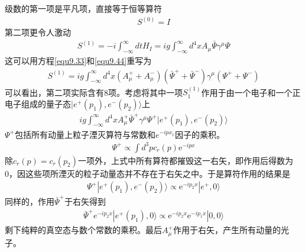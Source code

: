 级数的第一项是平凡项，直接等于恒等算符
\begin{align}\label{equ9.71}
S^{(0)}=I
\end{align}
第二项更令人激动
\begin{align}\label{equ9.72}
S^{(1)}=-i\int_{-\infty}^\infty dt H_I = ig\int_{-\infty}^\infty d^4x A_\mu \bar{\Psi}\gamma^\mu\Psi
\end{align}
这可以用方程\eqref{equ9.33}和\eqref{equ9.44}重写为
\begin{align}\label{equ9.73}
S^{(1)}=ig\int_{-\infty}^\infty d^4x (A_\mu^++A_\mu^-) (\bar{\Psi}^++\bar{\Psi}^-)\gamma^\mu(\Psi^++\Psi^-)
\end{align}
可以看出，第二项实际含有8项。考虑将其中一项$S_1^{(1)}$作用于由一个电子和一个正电子组成的量子态$|e^+(p_1),e^-(p_2)\rangle$上
\begin{gather*}
ig\int_{-\infty}^{\infty}d^4xA^+_\mu\bar{\Psi}^+\gamma^\mu\Psi^+|e^+(p_1),e^-(p_2)\rangle
\end{gather*}
$\Psi^+$包括所有动量上粒子湮灭算符与常数和$e^{-ip x_1}$因子的乘积。
\begin{gather*}
\Psi^+\propto\int d^3p c_r(p) \text{e}^{-ipx}
\end{gather*}
除$c_r(p)=c_r(p_2)$一项外，上式中所有算符都摧毁这一右矢，即作用后得数为0，因这些项所湮灭的粒子动量态并不存在于右矢之中。于是算符作用的结果是
\begin{gather*}
\Psi^+|e^+(p_1),e^-(p_2)\rangle\propto \text{e}^{-ip_2x}|e^+,0\rangle
\end{gather*}
同样的，作用$\bar{\Psi}^+$于右矢得到
\begin{gather*}
\bar{\Psi}^+e^{-ip_2x}|e^+(p_1), 0\rangle\propto \text{e}^{-ip_2 x}\text{e}^{-ip_1x}|0,0\rangle
\end{gather*}
剩下纯粹的真空态与数个常数的乘积。最后$A^+_\mu$作用于右矢，产生所有动量的光子。
{}

